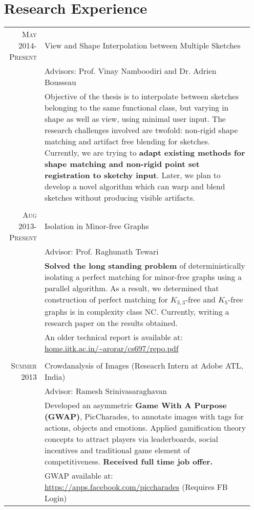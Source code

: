\documentclass[a4paper,10pt]{article}
\begin{document}
\section{Research Experience}
\begin{longtable}{r|p{12cm}}
 \textsc{May 2014-Present} & View and Shape Interpolation between Multiple Sketches\\
 &  {\small Advisors: Prof. Vinay Namboodiri and Dr. Adrien Bousseau}\\
 &\small{Objective of the thesis is to interpolate between sketches belonging to the same functional class, but varying in shape as well as view, using minimal user input. The research challenges involved are twofold: non-rigid shape matching and artifact free blending for sketches. Currently, we are trying to \textbf{adapt existing methods for shape matching and non-rigid point set registration to sketchy input}. Later, we plan to develop a novel algorithm which can warp and blend sketches without producing visible artifacts.}\\
 \multicolumn{2}{c}{} \\
 \textsc{Aug 2013-Present} & Isolation in Minor-free Graphs\\ 
 &{\small Advisor: Prof. Raghunath Tewari}\\
 &\small{\textbf{Solved the long standing problem} of deterministically isolating a perfect matching for minor-free graphs using a parallel algorithm. As a result, we determined that construction of perfect matching for $K_{3,3}$-free and $K_5$-free graphs is in complexity class NC. Currently, writing a research paper on the results obtained.}\\
 & \small{An older technical report is available at: \href{http://home.iitk.ac.in/~arorar/cs697/repo.pdf}{home.iitk.ac.in/\textasciitilde arorar/cs697/repo.pdf}}\\
 \multicolumn{2}{c}{} \\
\textsc{Summer 2013} & Crowdanalysis of Images (Reseacrh Intern at Adobe ATL, India)\\
&{\small Advisor: Ramesh Srinivasaraghavan}\\
&\small{Developed an asymmetric \textbf{Game With A Purpose (GWAP)}, PicCharades, to annotate images with tags for actions, objects and emotions. Applied gamification theory concepts to attract players via leaderboards, social incentives and traditional game element of competitiveness. \textbf{Received full time job offer.}}\\
& \small{GWAP available at: \href{https://apps.facebook.com/piccharades}{https://apps.facebook.com/piccharades} (Requires FB Login)}\\

\end{longtable}
\end{document}
